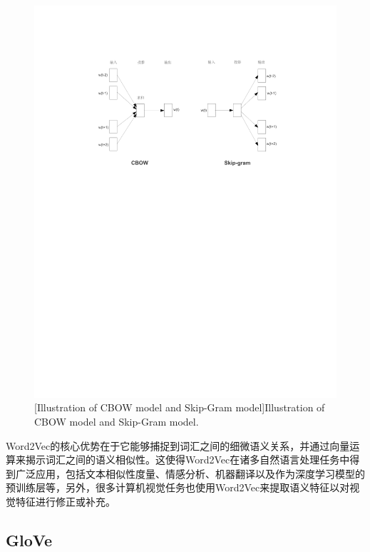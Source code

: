 \begin{figure}[h!]
  \centering
  \includegraphics[width=1.0\columnwidth]{figures/RelatedWork/Word2Vec.pdf}
  [Illustration of CBOW model and Skip-Gram model]{Illustration of CBOW model and Skip-Gram model.}
  \label{figure2: Word2Vec}
\end{figure}

Word2Vec的核心优势在于它能够捕捉到词汇之间的细微语义关系，并通过向量运算来揭示词汇之间的语义相似性。这使得Word2Vec在诸多自然语言处理任务中得到广泛应用，包括文本相似性度量、情感分析、机器翻译以及作为深度学习模型的预训练层等，另外，很多计算机视觉任务也使用Word2Vec来提取语义特征以对视觉特征进行修正或补充。

\subsection[\hspace{-2pt}GloVe]{{\heiti{} \hspace{-8pt}GloVe}}\label{section2: GloVe}

